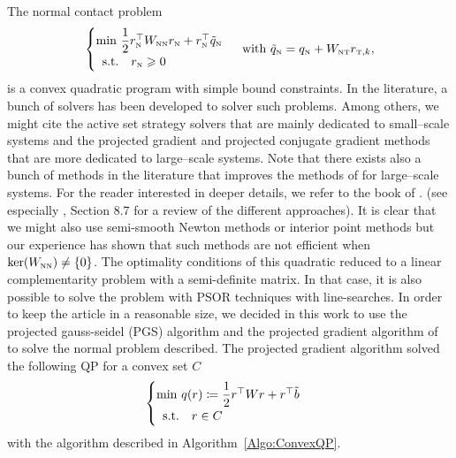 The normal contact problem
 \begin{equation}
  \label{eq:AO-3-bis}
  \begin{cases}
    \min\, \Frac 1 2 r_\n^\top  W_{\n\n} r_\n + r_\n^\top \tilde q_\n \\
    \begin{array}{ll}
    \text{s.t.} & r_\n \geq 0
  \end{array}\end{cases} \text{ with }   \tilde q_\n =  q_\n + W_{\n\t}r_{\t,k},
\end{equation}
is a convex quadratic program with simple bound constraints.
%
In the literature, a bunch of solvers has been developed to solver such problems. Among others, we might cite the active set strategy solvers \cite{Fletcher1987,Nocedal.Wright1999} that are mainly dedicated to  small--scale systems and the projected gradient \cite{Calamai.More1987} and projected conjugate gradient methods~\citep{More.Toraldo_NM1989,More.Toraldo1991} that are more dedicated to large--scale systems. Note that there exists also a bunch of methods in the literature that improves the methods of \cite{More.Toraldo1991} for large--scale systems. For the reader interested in deeper details, we refer to the book of \cite{Dostal.ea_AMM2016}. (see especially \cite{Dostal.ea_AMM2016}, Section 8.7 for a review of the different approaches).
%
It is clear that we might also use semi-smooth Newton methods or interior point methods but our experience has shown that such methods are not efficient when $\ker (W_{{\hbox{\tiny{N}}}{\hbox{\tiny{N}}}}) \neq \{0\}$. The optimality conditions of this quadratic reduced to a linear complementarity problem with a semi-definite matrix. In that case, it is also possible to solve the problem with PSOR techniques with line-searches.
%
In order to keep the article in a reasonable size, we decided in this work to use the projected gauss-seidel (PGS) algorithm and the projected gradient algorithm of   ~\cite{Calamai.More1987} to solve the normal problem described. The projected gradient algorithm solved
the following QP for a convex set $C$
 \begin{equation}
  \label{eq:ConvexQP}
  \begin{cases}
    \min\, q(r) \coloneqq \Frac 1 2 r^\top  W r + r ^\top \tilde b \\
    \begin{array}{ll}
    \text{s.t.} & r \in C
  \end{array}\end{cases}
\end{equation}
with the algorithm described in  Algorithm~\ref{Algo:ConvexQP}.

